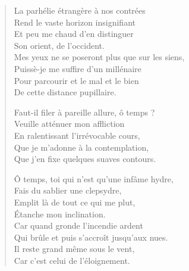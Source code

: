 \begin{verse}
  La parhélie étrangère à nos contrées\\  %
  Rend le vaste horizon insignifiant\\  %
  Et peu me chaud d’en distinguer\\  %
  Son orient, de l’occident.\\  %
  Mes yeux ne se poseront plus que sur les siens,\\  %
  Puissè-je me suffire d’un millénaire\\  %
  Pour parcourir et le mal et le bien\\  %
  De cette distance pupillaire.%
%

  Faut-il filer à pareille allure, ô temps ?\\  %
  Veuille atténuer mon affliction\\  %
  En ralentissant l’irrévocable cours,\\  %
  Que je m’adonne à la contemplation,\\  %
  Que j’en fixe quelques suaves contours.

  Ô temps, toi qui n’est qu’une infâme hydre,\\  
  Fais du sablier une clepsydre,\\  
  Emplit là de tout ce  qui me plut,\\  
  Étanche mon inclination.\\  
  Car quand gronde l’incendie ardent\\  
  Qui brûle et puis s’accroît jusqu’aux nues.\\  
  Il reste grand même sous le vent, \\  
  Car c’est celui de l’éloignement.  



\end{verse}
